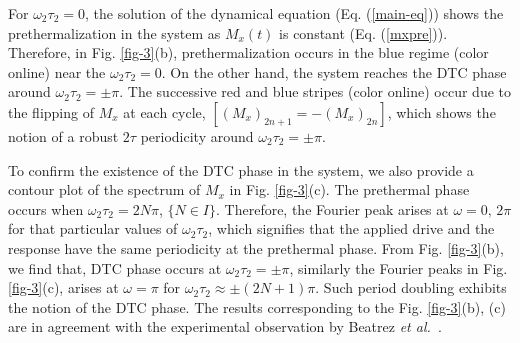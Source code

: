 \documentclass[prl,aps,preprint,floatfix]{revtex4-2}
\newcommand{\etal}{\textit{et al.\ }}
\begin{document}
For $\omega_2\tau_2 = 0$, the solution of the dynamical equation (Eq. (\ref{main-eq})) shows the prethermalization in the system as $M_x (t)$ is constant (Eq. (\ref{mxpre})). Therefore, in Fig. \ref{fig-3}(b), prethermalization occurs in the blue regime (color online) near the $\omega_2\tau_2 = 0$. On the other hand, the system reaches the DTC phase around  $\omega_2\tau_2 = \pm \pi$. The successive red and blue stripes (color online)  occur due to the flipping of $M_x$ at each cycle, $[(M_x)_{2n +1} = -(M_x)_{2n}]$, which shows the notion of a robust $2\tau$ periodicity around $\omega_2\tau_2 = \pm \pi$.

 To confirm the existence of the DTC phase in the system, we also provide a contour plot of the spectrum of $M_x$ in Fig. \ref{fig-3}(c).  The prethermal phase occurs when $\omega_2\tau_2 = 2N \pi$, $\{N \in I\}$. Therefore, the Fourier peak arises at $ \omega = 0, \, 2\pi$ for that particular values of $\omega_2 \tau_2$, which signifies that the applied drive and the response have the same periodicity at the prethermal phase. From Fig. \ref{fig-3}(b), we find that, DTC phase occurs at $\omega_2 \tau_2 = \pm \pi$, similarly the Fourier peaks in Fig. \ref{fig-3}(c), arises at $\omega =  \pi$ for $\omega_2 \tau_2 \approx \pm (2N +1) \pi$. Such period doubling exhibits the notion of the DTC phase. The results corresponding to the Fig. \ref{fig-3}(b), (c) are in agreement with the experimental observation by Beatrez \etal \citep{beatrez_critical_2023}. 
\end{document}

